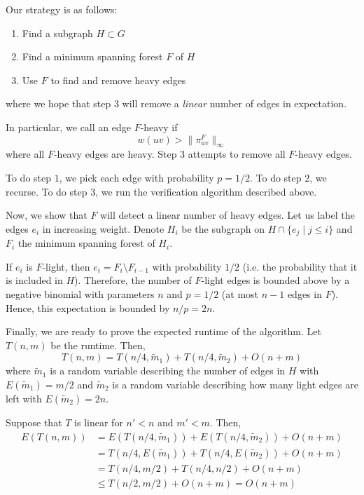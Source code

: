 \documentclass{article}
\newcommand{\norm}[1]{\| #1 \|_{\infty}}
\begin{document}
Our strategy is as follows:
\begin{enumerate}
    \item Find a subgraph $H \subset G$
    \item Find a minimum spanning forest $F$ of $H$
    \item Use $F$ to find and remove heavy edges
\end{enumerate}
where we hope that step $3$ will remove a \emph{linear} number of edges in expectation.

In particular, we call an edge $F$-heavy if
$$
    w(uv) > \norm{\pi^F_{uv}}
$$
where all $F$-heavy edges are heavy.
Step $3$ attempts to remove all $F$-heavy edges.

To do step $1$, we pick each edge with probability $p = 1/2$.
To do step $2$, we recurse.
To do step $3$, we run the verification algorithm described above.

Now, we show that $F$ will detect a linear number of heavy edges.
Let us label the edges $e_i$ in increasing weight.
Denote $H_i$ be the subgraph on $H \cap \{e_j \mid j \le i\}$ and $F_i$ the minimum spanning forest of $H_i$.

If $e_i$ is $F$-light, then $e_i = F_i \setminus F_{i-1}$ with probability $1/2$ (i.e. the probability that it is included in $H$).
Therefore, the number of $F$-light edges is bounded above by a negative binomial with parameters $n$ and $p=1/2$ (at most $n-1$ edges in $F$).
Hence, this expectation is bounded by $n/p = 2n$.

Finally, we are ready to prove the expected runtime of the algorithm.
Let $T(n, m)$ be the runtime.
Then,
$$
    T(n, m) = T(n/4, \tilde{m}_1) + T(n/4, \tilde{m}_2) + O(n+m)
$$
where $\tilde{m}_1$ is a random variable describing the number of edges in $H$ with $E(\tilde{m}_1) = m/2$ and $\tilde{m}_2$ is a random variable describing how many light edges are left with $E(\tilde{m}_2) = 2n$.

Suppose that $T$ is linear for $n' < n$ and $m' < m$.
Then,
\begin{align*}
    E(T(n, m)) & = E(T(n/4, \tilde{m}_1)) + E(T(n/4, \tilde{m}_2)) + O(n+m) \\
               & = T(n/4, E(\tilde{m}_1)) + T(n/4, E(\tilde{m}_2)) + O(n+m) \\
               & = T(n/4, m/2) + T(n/4, n/2) + O(n+m)                       \\
               & \le T(n/2, m/2) + O(n+m) = O(n+m)
\end{align*}
\end{document}
